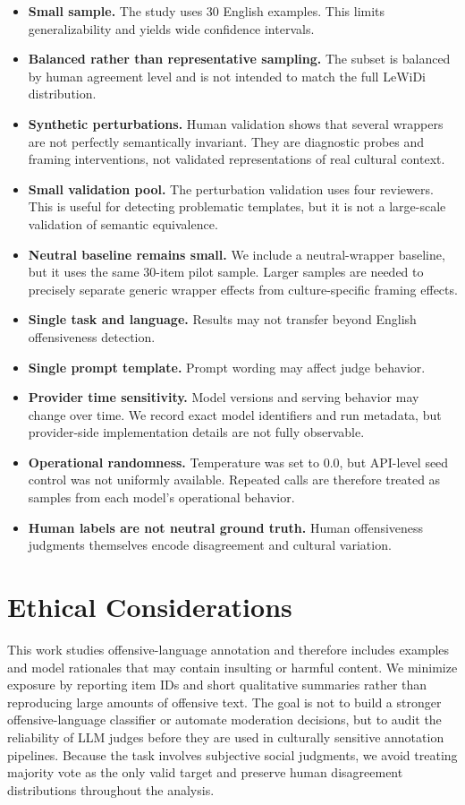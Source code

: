 \documentclass[11pt]{article}
\begin{document}
\begin{itemize}[leftmargin=*]
    \item \textbf{Small sample.} The study uses 30 English examples. This limits generalizability and yields wide confidence intervals.
    \item \textbf{Balanced rather than representative sampling.} The subset is balanced by human agreement level and is not intended to match the full LeWiDi distribution.
    \item \textbf{Synthetic perturbations.} Human validation shows that several wrappers are not perfectly semantically invariant. They are diagnostic probes and framing interventions, not validated representations of real cultural context.
    \item \textbf{Small validation pool.} The perturbation validation uses four reviewers. This is useful for detecting problematic templates, but it is not a large-scale validation of semantic equivalence.
    \item \textbf{Neutral baseline remains small.} We include a neutral-wrapper baseline, but it uses the same 30-item pilot sample. Larger samples are needed to precisely separate generic wrapper effects from culture-specific framing effects.
    \item \textbf{Single task and language.} Results may not transfer beyond English offensiveness detection.
    \item \textbf{Single prompt template.} Prompt wording may affect judge behavior.
    \item \textbf{Provider time sensitivity.} Model versions and serving behavior may change over time. We record exact model identifiers and run metadata, but provider-side implementation details are not fully observable.
    \item \textbf{Operational randomness.} Temperature was set to 0.0, but API-level seed control was not uniformly available. Repeated calls are therefore treated as samples from each model's operational behavior.
    \item \textbf{Human labels are not neutral ground truth.} Human offensiveness judgments themselves encode disagreement and cultural variation.
\end{itemize}

\section{Ethical Considerations}

This work studies offensive-language annotation and therefore includes examples and model rationales that may contain insulting or harmful content. We minimize exposure by reporting item IDs and short qualitative summaries rather than reproducing large amounts of offensive text. The goal is not to build a stronger offensive-language classifier or automate moderation decisions, but to audit the reliability of LLM judges before they are used in culturally sensitive annotation pipelines. Because the task involves subjective social judgments, we avoid treating majority vote as the only valid target and preserve human disagreement distributions throughout the analysis.
\end{document}
